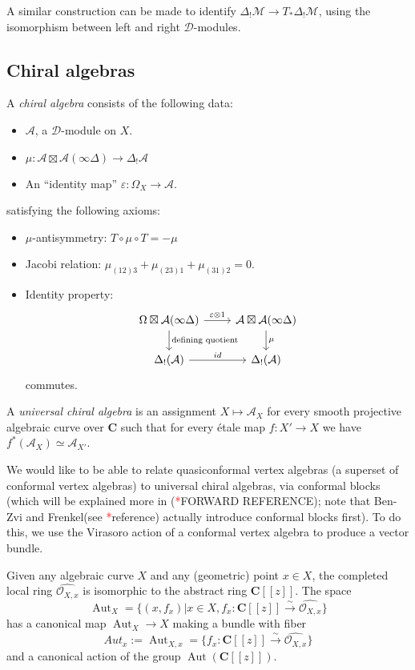 \documentclass{article}
\newcommand{\CC}{\mathbold{C}}
\newcommand{\Oo}{\mathcal{O}}
\newcommand{\Dd}{\mathcal{D}}
\newcommand{\Aa}{\mathcal{A}}
\newcommand{\Mm}{\mathcal{M}}
\newcommand{\tk}{\textcolor{red}{*}}
\DeclareMathOperator{\Aut}{Aut}
\begin{document}
A similar construction can be made to identify $\Delta_!\Mm \rightarrow T_*\Delta_!\Mm$, using the isomorphism between left and right $\Dd$-modules.
\subsection{Chiral algebras}
\label{sec:chiraldef}
A \textit{chiral algebra} consists of the following data:
\begin{itemize}
\item $\Aa$, a $\Dd$-module on $X$.
\item $\mu: \Aa \boxtimes \Aa (\infty \Delta) \rightarrow \Delta_! \Aa$
\item An ``identity map'' $\varepsilon: \Omega_X \rightarrow \Aa$.
\end{itemize}
satisfying the following axioms:
\begin{itemize}
\item $\mu$-antisymmetry: $T \circ \mu \circ T=-\mu$
\item Jacobi relation: $\mu_{(12)3}+\mu_{(23)1}+\mu_{(31)2}=0$.
\item Identity property:
\[
  \begin{tikzcd}
    \Omega \boxtimes \Aa (\infty \Delta) \arrow[r,"\varepsilon \otimes 1"] \arrow[d,"\textrm{defining quotient}"] & \Aa \boxtimes \Aa (\infty \Delta) \arrow[d,"\mu"]\\
    \Delta_!(\Aa) \arrow[r,"id"] & \Delta_!(\Aa)
  \end{tikzcd}
\]
commutes.
\end{itemize}
A \textit{universal chiral algebra} is an assignment $X \mapsto \Aa_X$ for every smooth projective algebraic curve over $\CC$ such that for every étale map $f: X' \rightarrow X$ we have $f^*(\Aa_X) \simeq \Aa_{X'}$.

We would like to be able to relate quasiconformal vertex algebras (a superset of conformal vertex algebras) to universal chiral algebras, via conformal blocks (which will be explained more in (\tk FORWARD REFERENCE); note that Ben-Zvi and Frenkel(see \tk reference) actually introduce conformal blocks first).  To do this, we use the Virasoro action of a conformal vertex algebra to produce a vector bundle.

Given any algebraic curve $X$ and any (geometric) point $x \in X$, the completed local ring $\widehat{\Oo_{X,x}}$ is isomorphic to the abstract ring $\CC[[z]]$.  The space
\[\Aut_X=\{(x,f_x)|x \in X, f_x: \CC[[z]] \overset{\sim}{\rightarrow} \widehat{\Oo_{X,x}} \} \]
has a canonical map $\Aut_X \rightarrow X$ making a bundle with fiber
\[Aut_x := \Aut_{X,x} = \{f_x: \CC[[z]] \overset{\sim}{\rightarrow} \widehat{\Oo_{X,x}} \} \]
and a canonical action of the group $\Aut(\CC[[z]])$.
\end{document}
